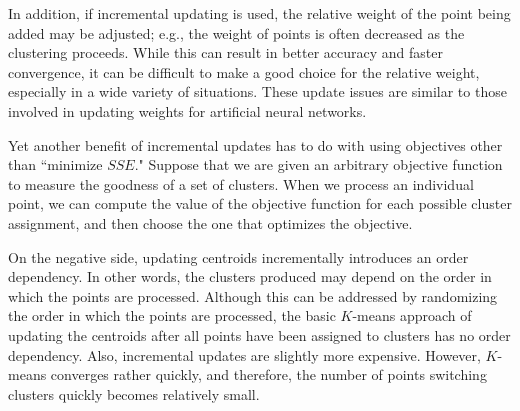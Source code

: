 In addition, if incremental updating is used, the relative weight of the point
being added may be adjusted; e.g., the weight of points is often decreased as
the clustering proceeds.  While this can result in better accuracy and faster
convergence, it can be difficult to make a good choice for the relative weight,
especially in a wide variety of situations.  These update issues are similar to
those involved in updating weights for artificial neural networks.

Yet another benefit of incremental updates has to do with using objectives
other than ``minimize $SSE$." Suppose that we are given an arbitrary objective
function to measure the goodness of a set of clusters.  When we process an
individual point, we can compute the value of the objective function for each
possible cluster assignment, and then choose the one that optimizes the objective.

On the negative side, updating centroids incrementally introduces an order dependency.
In other words, the clusters produced may depend on the
order in which the points are processed.  Although this can be addressed by
randomizing the order in which the points are processed, the basic $K$-means
approach of updating the centroids after all points have been assigned to clusters
has no order dependency.  Also, incremental updates are slightly more
expensive.   However,  $K$-means converges rather quickly,  and therefore,  the
number of points switching clusters quickly becomes relatively small.

\endinput
